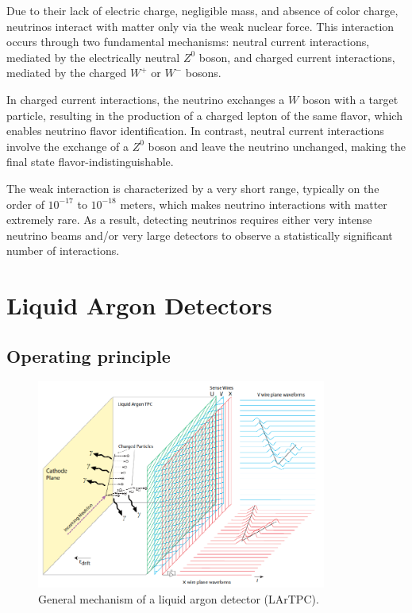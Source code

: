 \documentclass{pracalicmgr}
\begin{document}
Due to their lack of electric charge, negligible mass, and absence of color charge, neutrinos interact with matter only via the weak nuclear force. This interaction occurs through two fundamental mechanisms: neutral current interactions, mediated by the electrically neutral $Z^0$ boson, and charged current interactions, mediated by the charged $W^+$ or $W^-$ bosons.

In charged current interactions, the neutrino exchanges a $W$ boson with a target particle, resulting in the production of a charged lepton of the same flavor, which enables neutrino flavor identification. In contrast, neutral current interactions involve the exchange of a $Z^0$ boson and leave the neutrino unchanged, making the final state flavor-indistinguishable.

The weak interaction is characterized by a very short range, typically on the order of $10^{-17}$ to $10^{-18}$ meters, which makes neutrino interactions with matter extremely rare. As a result, detecting neutrinos requires either very intense neutrino beams and/or very large detectors to observe a statistically significant number of interactions.

\section{Liquid Argon Detectors}

\subsection{Operating principle}

\begin{figure}[H]
    \centering
    \includegraphics[width=0.85\textwidth]{src/LAr_diagram_DUNE.png}
    \caption{General mechanism of a liquid argon detector (LArTPC).}
    \label{fig:lartcp}
\end{figure}
\end{document}
